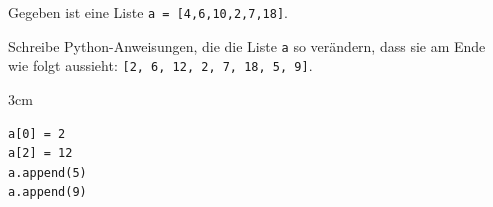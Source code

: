 \question[3]
Gegeben ist eine Liste \texttt{a = [4,6,10,2,7,18]}.

Schreibe Python-Anweisungen, die die Liste \texttt{a} so verändern, dass sie am Ende \\
wie folgt aussieht:  \texttt{[2, 6, 12, 2, 7, 18, 5, 9]}.

\begin{solutionbox}{3cm}
\begin{lstlisting}
a[0] = 2
a[2] = 12
a.append(5)
a.append(9)
\end{lstlisting}
\end{solutionbox}
